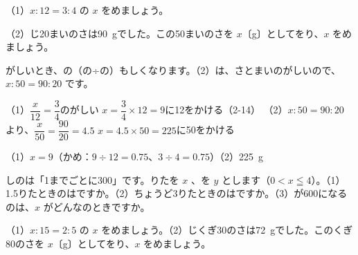 \begin{reidai}[\R{比例}{ひ|れい}\R{式}{しき}を\R{解}{と}く]
（1）$x:12=3:4$ の $x$ をめましょう。\par
（2）じ20まいのさは\qty{90}{g}でした。この50まいのさを $x$〔g〕としてをり、$x$ をめましょう。\par
\kangaekata {}がしいとき、の（の÷の）もしくなります。（2）は、さとまいのがしいので、$x:50=90:20$ です。\par
\bkthrdSi（1）\nobreak $\dfrac{x}{12}=\dfrac{3}{4}$\quad {}のがしい
\bkthrdJ $x=\dfrac{3}{4}\times12=9$\quad {}に12をかける（2-14）
\bkthrdI（2）\nobreak $x:50=90:20$ より、$\dfrac{x}{50}=\dfrac{90}{20}=4.5$
\bkthrdJ $x=4.5\times50=225$\quad {}に50をかける\par
\bkthrdK（1）\nobreak $x=9$（かめ：$9\div12=0.75$、$3\div4=0.75$）\quad（2）\nobreak \qty{225}{g}
\end{reidai}

\begingroup{}%
\noindent\begin{minipage}[t]{0.49\linewidth}
\begin{jibun}
しのは「1までごとに300」です。りたを $x$ 、を $y$ とします（$0<x\leqq4$）。（1）1.5りたときのはですか。（2）ちょうど3りたときのはですか。（3）が600になるのは、$x$ がどんなのときですか。
\end{jibun}
\end{minipage}\hfill
\begin{minipage}[t]{0.49\linewidth}
\begin{jibun}
（1）$x:15=2:5$ の $x$ をめましょう。（2）じくぎ30のさは\qty{72}{g}でした。このくぎ80のさを $x$〔g〕としてをり、$x$ をめましょう。
\end{jibun}
\end{minipage}\par
\endgroup

